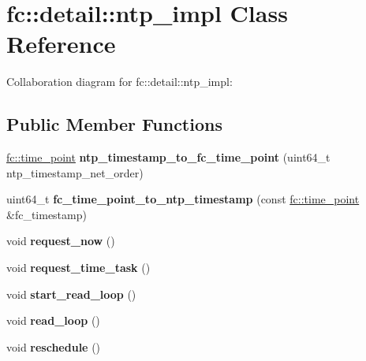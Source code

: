 \hypertarget{classfc_1_1detail_1_1ntp__impl}{}\section{fc\+:\+:detail\+:\+:ntp\+\_\+impl Class Reference}
\label{classfc_1_1detail_1_1ntp__impl}


Collaboration diagram for fc\+:\+:detail\+:\+:ntp\+\_\+impl\+:
\subsection*{Public Member Functions}
\begin{DoxyCompactItemize}
\item 
\mbox{\label{classfc_1_1detail_1_1ntp__impl_a4109156bd9378f4234f3d5601577086f}} 
\mbox{\hyperlink{classfc_1_1time__point}{fc\+::time\+\_\+point}} {\bfseries ntp\+\_\+timestamp\+\_\+to\+\_\+fc\+\_\+time\+\_\+point} (uint64\+\_\+t ntp\+\_\+timestamp\+\_\+net\+\_\+order)
\item 
\mbox{\label{classfc_1_1detail_1_1ntp__impl_ab9d9f99d97d36f87dca4c0444d395502}} 
uint64\+\_\+t {\bfseries fc\+\_\+time\+\_\+point\+\_\+to\+\_\+ntp\+\_\+timestamp} (const \mbox{\hyperlink{classfc_1_1time__point}{fc\+::time\+\_\+point}} \&fc\+\_\+timestamp)
\item 
\mbox{\label{classfc_1_1detail_1_1ntp__impl_aabb55b1b1ca4de17db3d2b7f3f3ab56a}} 
void {\bfseries request\+\_\+now} ()
\item 
\mbox{\label{classfc_1_1detail_1_1ntp__impl_ab2beecf0f92d0bad2bdd8047f45ab599}} 
void {\bfseries request\+\_\+time\+\_\+task} ()
\item 
\mbox{\label{classfc_1_1detail_1_1ntp__impl_a70d5cd30257c17171bc81e7dba288664}} 
void {\bfseries start\+\_\+read\+\_\+loop} ()
\item 
\mbox{\label{classfc_1_1detail_1_1ntp__impl_a5b3a58d9010e8ca23ee3e287595b8967}} 
void {\bfseries read\+\_\+loop} ()
\item 
\mbox{\label{classfc_1_1detail_1_1ntp__impl_a3ee1de6f11e03bf63ac439e5bddec0b7}} 
void {\bfseries reschedule} ()
\end{DoxyCompactItemize}
